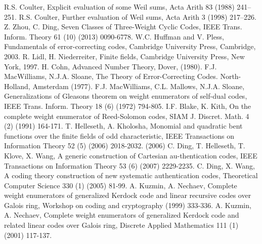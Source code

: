 \documentclass[final,1p,times]{elsarticle}
\begin{document}
\begin{thebibliography}{99}
 R.S. Coulter, Explicit evaluation of some Weil sums, Acta Arith 83 (1988) 241–251.
 R.S. Coulter, Further evaluation of Weil sums, Acta Arith 3 (1998) 217–226.
 Z. Zhou, C. Ding, Seven Classes of Three-Weight Cyclic Codes, IEEE Trans. Inform. Theory 61 (10) (2013) 0090-6778.
 W.C. Huffman and V. Pless, Fundamentals of error-correcting codes,  Cambridge University Press, Cambridge, 2003.
 R. Lidl, H. Niederreiter, Finite fields, Cambridge University Press, New York, 1997.
  H. Cohn, Advanced Number Theory, Dover, (1980).
  F.J. MacWilliams, N.J.A. Sloane, The Theory of Error-Correcting Codes. North-Holland, Amsterdam (1977).
  F.J. MacWilliams, C.L. Mallows, N.J.A. Sloane, Generalizations of Gleasons theorem on weight enumerators of self-dual codes,
  IEEE Trans. Inform. Theory 18 (6) (1972) 794-805.
  I.F. Blake, K. Kith, On the complete weight enumerator of Reed-Solomon codes, SIAM J. Discret. Math. 4 (2) (1991) 164-171.
  T. Helleseth, A. Kholosha, Monomial and quadratic bent functions over the finite fields of odd characteristic, IEEE Transactions on Information Theory 52 (5) (2006) 2018-2032.
  (2006)
  C. Ding, T. Helleseth, T. Klove, X. Wang,  A generic construction of Cartesian au-thentication codes, IEEE Transactions on Information Theory 53 (6) (2007) 2229-2235. 
  C. Ding, X. Wang,  A coding theory construction of new systematic authentication codes, Theoretical Computer Science 330 (1) (2005) 81-99. 
  A. Kuzmin, A. Nechaev, Complete weight enumerators of generalized Kerdock code and linear recursive codes over Galois ring, Workshop on coding and cryptography (1999) 333-336.
  A. Kuzmin, A. Nechaev, Complete weight enumerators of generalized Kerdock code and related linear codes over Galois ring, Discrete Applied Mathematics 111 (1) (2001) 117-137.

\end{thebibliography}
\end{document}
